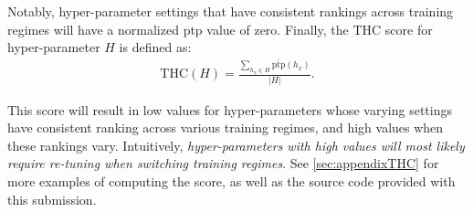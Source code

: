 Notably, hyper-parameter settings that have consistent rankings across training regimes will have a normalized $\textrm{ptp}$ value of zero. Finally, the $\textrm{THC}$ score for hyper-parameter $H$ is defined as:
\begin{align}
    \textrm{THC}(H) = \frac{\sum_{h_x\in H}\overline{\textrm{ptp}}(h_x)}{|H|}.
    \label{eqn:thc}
\end{align}

This score will result in low values for hyper-parameters whose varying settings have consistent ranking across various training regimes, and high values when these rankings vary. Intuitively, {\em hyper-parameters with high values will most likely require re-tuning when switching training regimes}. See \autoref{sec:appendixTHC} for more examples of computing the score, as well as the source code provided with this submission.


